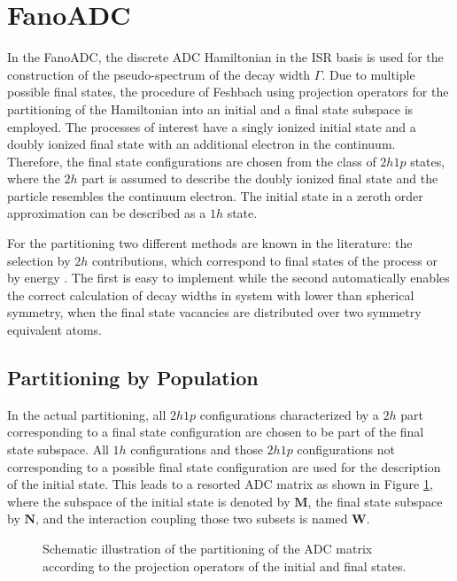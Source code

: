 \section{FanoADC}
In the FanoADC, the discrete ADC Hamiltonian in the \ac{ISR}
basis is used for the construction of the pseudo-spectrum of the decay width
$\Gamma$.
Due to multiple possible final states, the procedure
of Feshbach using projection operators for the partitioning of the Hamiltonian
into an initial and a final state subspace is employed.
The processes of interest have a singly ionized initial state and a
doubly ionized final state with an additional electron in the continuum.
Therefore, the final state configurations are chosen from
the class of $2h1p$ states, where the $2h$ part is assumed to
describe the doubly ionized final state and the particle resembles the continuum electron.
The initial state in a zeroth order approximation can be described as a $1h$ state.

For the partitioning two different methods are known in the literature:
the selection by $2h$ contributions, which correspond to final states of
the process or by energy \cite{Averbukh05}.
The first is easy to implement while the second automatically
enables the correct calculation of decay widths in system with lower than
spherical symmetry, when the final state vacancies are distributed over two symmetry
equivalent atoms.


\subsection{Partitioning by Population}
In the actual partitioning, all $2h1p$ configurations characterized by a $2h$
part corresponding to
a final state configuration are chosen to be part of the final state subspace.
All $1h$ configurations and those $2h1p$ configurations not corresponding
to a possible final state configuration are used for the description
of the initial state. This leads to a resorted \ac{ADC} matrix as shown in
Figure \ref{figure:fano_matsort}, where the subspace of the initial state
is denoted by $\mathbf{M}$, the final state subspace by $\mathbf{N}$, and
the interaction coupling those two subsets is named $\mathbf{W}$.

\begin{figure}[h]
  \centering
  
  \caption{Schematic illustration of the partitioning of the \ac{ADC} matrix
           according to the projection operators of the initial and final
           states.}
  \label{figure:fano_matsort}
\end{figure}

